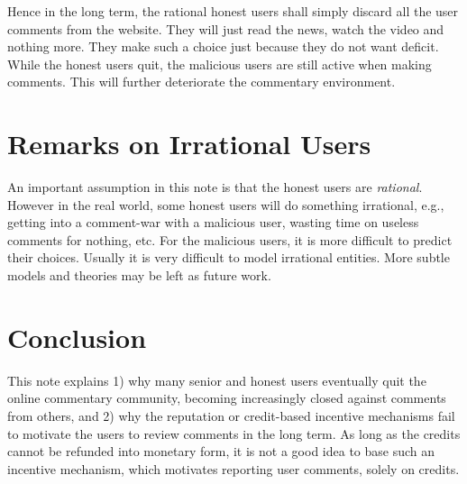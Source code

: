 \documentclass[12pt]{article}
\begin{document}
Hence in the long term, the rational honest users shall simply discard all the user comments from the website. They will just read the news, watch the video and nothing more. They make such a choice just because they do not want deficit. While the honest users quit, the malicious users are still active when making comments. This will further deteriorate the commentary environment.

\section{Remarks on Irrational Users}
An important assumption in this note is that the honest users are \emph{rational}. However in the real world, some honest users will do something irrational, e.g., getting into a comment-war with a malicious user, wasting time on useless comments for nothing, etc. For the malicious users, it is more difficult to predict their choices. Usually it is very difficult to model irrational entities. More subtle models and theories may be left as future work.

\section{Conclusion}
This note explains 1) why many senior and honest users eventually quit the online commentary community, becoming increasingly closed against comments from others, and 2) why the reputation or credit-based incentive mechanisms fail to motivate the users to review comments in the long term. As long as the credits cannot be refunded into monetary form, it is not a good idea to base such an incentive mechanism, which motivates reporting user comments, solely on credits.
\end{document}
